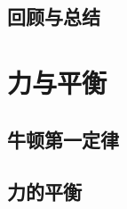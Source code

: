 \documentclass[color=purple,openany]{textbook-cn}
\begin{document}
\begin{Link}
\zhlipsum[1]
\end{Link}


\section{回顾与总结}

\begin{Point}
\lipsum[2]
\end{Point}

\begin{Case*}
\item \lipsum[1][3]
\item \lipsum[1][3]
\item \lipsum[1][3]
\item \lipsum[1][3]
\end{Case*}

\begin{Link}
\zhlipsum[1]
\end{Link}


\chaptersaying{\lipsum[1][6]}
\chapter{力与平衡}


\begin{Block}[章节引入]
\lipsum[1-3]
\end{Block}

\section{牛顿第一定律}

\begin{Point}
\lipsum[2]
\end{Point}

\begin{Case}
\item \lipsum[1][3]
\item \lipsum[1][3]
\item \lipsum[1][3]
\item \lipsum[1][3]
\end{Case}

\begin{Link}
\zhlipsum[1]
\end{Link}




\section{力的平衡}
\end{document}
